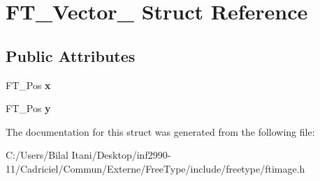 \hypertarget{struct_f_t___vector__}{}\section{F\+T\+\_\+\+Vector\+\_\+ Struct Reference}
\label{struct_f_t___vector__}
\subsection*{Public Attributes}
\begin{DoxyCompactItemize}
\item 
F\+T\+\_\+\+Pos {\bfseries x}\hypertarget{struct_f_t___vector___a941e818e6dfca06409cddff4f325f74c}{}\label{struct_f_t___vector___a941e818e6dfca06409cddff4f325f74c}

\item 
F\+T\+\_\+\+Pos {\bfseries y}\hypertarget{struct_f_t___vector___ac3246ed214e880047ec74eeb15f8b973}{}\label{struct_f_t___vector___ac3246ed214e880047ec74eeb15f8b973}

\end{DoxyCompactItemize}


The documentation for this struct was generated from the following file\+:\begin{DoxyCompactItemize}
\item 
C\+:/\+Users/\+Bilal Itani/\+Desktop/inf2990-\/11/\+Cadriciel/\+Commun/\+Externe/\+Free\+Type/include/freetype/ftimage.\+h\end{DoxyCompactItemize}

